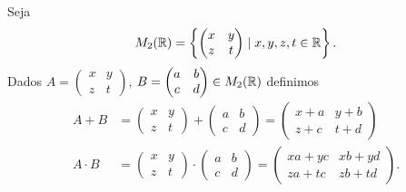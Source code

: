 \documentclass[12pt]{article}
\begin{document}
\questao Seja
\[
	M_2(\mathbb{R}) = \left\{\begin{pmatrix}
		x & y\\z & t 
	\end{pmatrix} \mid x, y, z, t \in \mathbb{R} \right\}.
\]
Dados $A = \begin{pmatrix}
		x & y\\z & t 
	\end{pmatrix}$, $B = \begin{pmatrix}
		a & b\\c & d 
	\end{pmatrix} \in M_2(\mathbb{R})$ definimos
\begin{align*}
	A + B &= \begin{pmatrix}
		x & y\\z & t 
	\end{pmatrix} + \begin{pmatrix}
		a & b\\c & d 
	\end{pmatrix} = \begin{pmatrix}
		x + a & y + b\\z + c & t + d 
	\end{pmatrix}\\
	A \cdot B &= \begin{pmatrix}
		x & y\\z & t 
	\end{pmatrix} \cdot \begin{pmatrix}
		a & b\\c & d 
	\end{pmatrix} = \begin{pmatrix}
		xa + yc & xb + yd\\za + tc & zb + td 
	\end{pmatrix}.
\end{align*}
\end{document}
